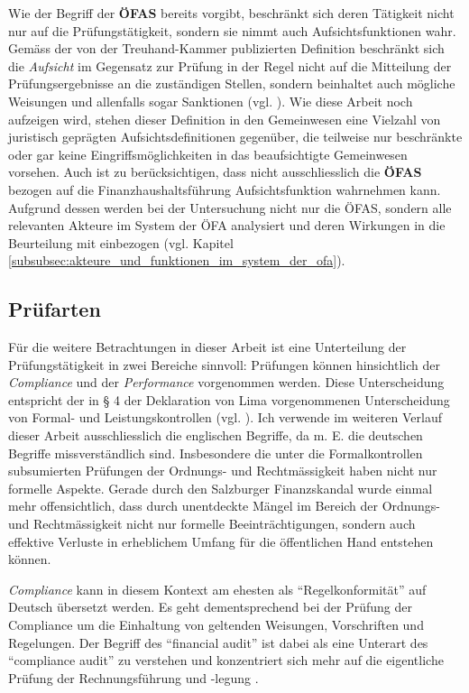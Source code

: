 \documentclass[10pt]{article}
\begin{document}
Wie der Begriff der \textbf{ÖFAS} bereits vorgibt, beschränkt sich deren Tätigkeit nicht nur auf die Prüfungstätigkeit, sondern sie nimmt auch Aufsichtsfunktionen wahr. Gemäss der von der Treuhand-Kammer publizierten Definition beschränkt sich die \textit{Aufsicht} im Gegensatz zur Prüfung in der Regel nicht auf die Mitteilung der Prüfungsergebnisse an die zuständigen Stellen, sondern beinhaltet auch mögliche Weisungen und allenfalls sogar Sanktionen (vgl. \cite[S. 4]{WP2}). Wie diese Arbeit noch aufzeigen wird, stehen dieser Definition in den Gemeinwesen eine Vielzahl von juristisch geprägten Aufsichtsdefinitionen gegenüber, die teilweise nur beschränkte oder gar keine Eingriffsmöglichkeiten in das beaufsichtigte Gemeinwesen vorsehen. Auch ist zu berücksichtigen, dass nicht ausschliesslich die \textbf{ÖFAS} bezogen auf die Finanzhaushaltsführung Aufsichtsfunktion wahrnehmen kann. Aufgrund dessen werden bei der Untersuchung nicht nur die ÖFAS, sondern alle relevanten Akteure im System der ÖFA analysiert und deren Wirkungen in die Beurteilung mit einbezogen (vgl. Kapitel \vref{subsubsec:akteure_und_funktionen_im_system_der_ofa}).

\subsection{Prüfarten}\label{subsec:pruefarten}
Für die weitere Betrachtungen in dieser Arbeit ist eine Unterteilung der Prüfungstätigkeit in zwei Bereiche sinnvoll: Prüfungen können hinsichtlich der \textit{Compliance} und der \textit{Performance} vorgenommen werden. Diese Unterscheidung entspricht der in § 4 der Deklaration von Lima vorgenommenen Unterscheidung von Formal- und Leistungskontrollen (vgl. \cite[§4. III-19]{INTOSAI1977}). Ich verwende im weiteren Verlauf dieser Arbeit ausschliesslich die englischen Begriffe, da m. E. die deutschen Begriffe missverständlich sind. Insbesondere die unter die Formalkontrollen subsumierten Prüfungen der Ordnungs- und Rechtmässigkeit haben nicht nur formelle Aspekte. Gerade durch den Salzburger Finanzskandal wurde einmal mehr offensichtlich, dass durch unentdeckte Mängel im Bereich der Ordnungs- und Rechtmässigkeit nicht nur formelle Beeinträchtigungen, sondern auch effektive Verluste in erheblichem Umfang für die öffentlichen Hand entstehen können.

\textit{Compliance} kann in diesem Kontext am ehesten als “{}Regelkonformität”{} auf Deutsch übersetzt werden. Es geht dementsprechend bei der Prüfung der Compliance um die Einhaltung von geltenden Weisungen, Vorschriften und Regelungen. Der Begriff des “{}financial audit”{} ist dabei als eine Unterart des “{}compliance audit”{} zu verstehen und konzentriert sich mehr auf die eigentliche Prüfung der Rechnungsführung und -legung \cite[586]{Festschrift2014}.
\end{document}
